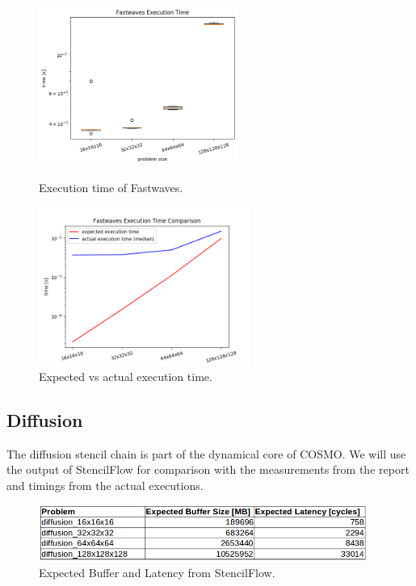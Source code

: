 \begin{figure}[h]
	\begin{minipage}{.5\columnwidth}
		\centering
		\includegraphics[height=14em]{plots/fastwaves_execution_time.png}
		\caption{Execution time of Fastwaves.}
		\label{fig:fastwaves_execution_time}
	\end{minipage}
	\begin{minipage}{.5\columnwidth}
		\centering
		\includegraphics[height=14em]{plots/fastwaves_execution_time_comparison.png}
		\caption{Expected vs actual execution time.}
		\label{fig:fastwaves_execution_time_comparison}
	\end{minipage}
\end{figure}



\subsection{Diffusion} 
The diffusion stencil chain is part of the dynamical core of COSMO. We will use the output of StencilFlow for comparison with the measurements from the report and timings from the actual executions.

\begin{figure}[h]
	\centering
	\includegraphics[height=5em]{images/diffusion-buffer-latency.png}
	\caption{Expected Buffer and Latency from StencilFlow.}
	\label{fig:diffusion-buffer-latency}
\end{figure}


